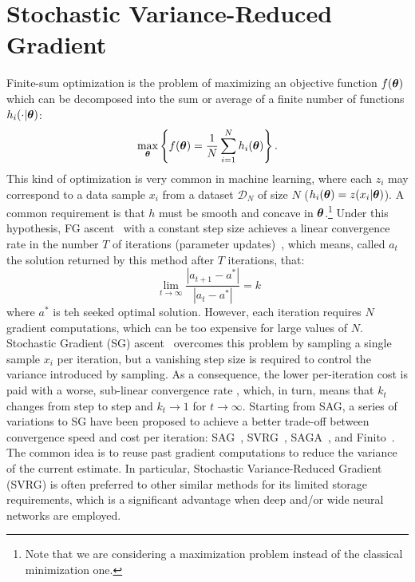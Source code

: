 \section{Stochastic Variance-Reduced Gradient}\label{sec:svrg}
\vspace{-0.05in}
Finite-sum optimization is the problem of maximizing an objective function $f(\boldsymbol{\theta})$ which can be decomposed into the sum or average of a finite number of functions $h_i(\cdot|\boldsymbol{\theta})$:
\begin{align*}
        \max_{\boldsymbol{\theta}} \left\{ f(\boldsymbol{\theta}) = \frac{1}{N}\sum_{i=1}^{N}h_i(\boldsymbol{\theta})\right\}.
\end{align*}
This kind of optimization is very common in machine learning, where each $z_i$ may correspond to a data sample $x_i$ from a dataset $\mathcal{D}_N$ of size $N$ (\ie $h_i(\boldsymbol{\theta}) = z(x_i|\boldsymbol{\theta})$). 
A common requirement is that $h$ must be smooth and concave in $\boldsymbol{\theta}$.\footnote{Note that we are considering a maximization problem instead of the classical minimization one.} 
Under this hypothesis, \acs{FG} ascent~\citep{cauchy1847methode} with a constant step size achieves a linear convergence rate in the number $T$ of iterations (\ie parameter updates)~\citep{nesterov2013introductory}, which means, called $a_t$ the solution returned by this method after $T$ iterations, that:
\[
\ \lim_{t\rightarrow \infty}\frac{|a_{t+1}-a^*|}{|a_t-a^*|}=k
\]
where $a^*$ is teh seeked optimal solution.\newline
However, each iteration requires $N$ gradient computations, which can be too expensive for large values of $N$. Stochastic Gradient (\acs{SG}) ascent~\citep[\eg][]{robbins1951stochastic,bottou2004large} overcomes this problem by sampling a single sample $x_i$ per iteration, but a vanishing step size is required to control the variance introduced by sampling. As a consequence, the lower per-iteration cost is paid with a worse, sub-linear convergence rate \citep{nemirovskii1983problem}, which, in turn, means that $k_t$ changes from step to step and $k_t\rightarrow 1$ for $t \rightarrow \infty$.\newline
Starting from \acs{SAG}, a series of variations to \acs{SG} have been proposed to achieve a better trade-off between convergence speed and cost per iteration: \eg \acs{SAG}~\citep{roux2012stochastic}, \acs{SVRG}~\citep{johnson2013accelerating}, \acs{SAGA}~\citep{defazio2014saga}, and Finito~\citep{defazio2014finito}. 
The common idea is to reuse past gradient computations to reduce the variance of the current estimate.
In particular, Stochastic Variance-Reduced Gradient (\acs{SVRG}) is often preferred to other similar methods for its limited storage requirements, which is a significant advantage when deep and/or wide neural networks are employed.

